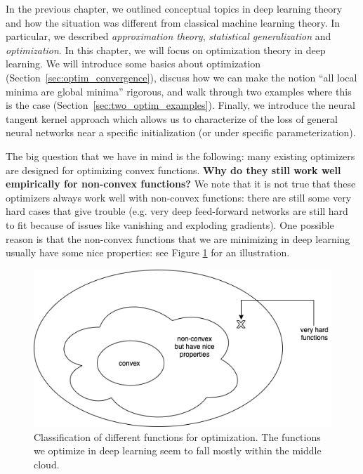 \setcounter{section}{0}


In the previous chapter, we outlined conceptual topics in deep learning theory and how the situation was different from classical machine learning theory. In particular, we described \textit{approximation theory}, \textit{statistical generalization} and \textit{optimization}. In this chapter, we will focus on optimization theory in deep learning. We will introduce some basics about optimization (Section~\ref{sec:optim_convergence}), discuss how we can make the notion ``all local minima are global minima'' rigorous, and walk through two examples where this is the case (Section~\ref{sec:two_optim_examples}). Finally, we introduce the neural tangent kernel approach which allows us to characterize of the loss of general neural networks near a specific initialization (or under specific parameterization).

 \label{sec:optim_intro}

The big question that we have in mind is the following: many existing optimizers are designed for optimizing convex functions. \textbf{Why do they still work well empirically for non-convex functions?} We note that it is not true that these optimizers always work well with non-convex functions: there are still some very hard cases that give trouble (e.g. very deep feed-forward networks are still hard to fit because of issues like vanishing and exploding gradients). One possible reason is that the non-convex functions that we are minimizing in deep learning usually have some nice properties: see Figure \ref{lec10:fig:optimization} for an illustration.

\begin{figure}[ht!]
    \centering
    \includegraphics[scale = 0.5]{figures/landscape.png}
    \caption{Classification of different functions for optimization. The functions we optimize in deep learning seem to fall mostly within the middle cloud.}
    \label{lec10:fig:optimization}
\end{figure}

